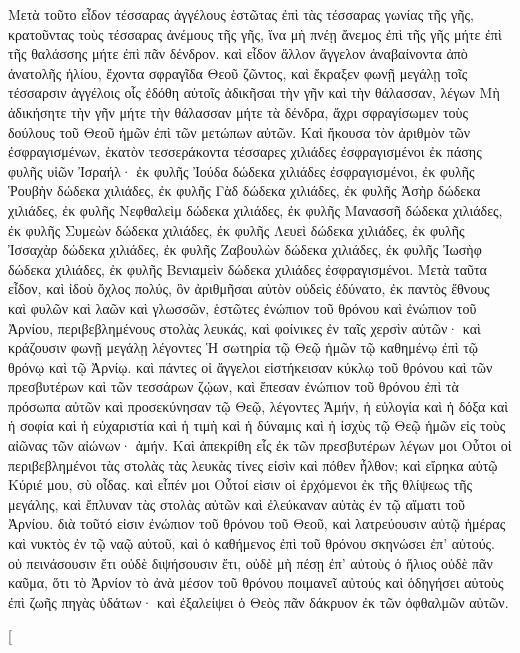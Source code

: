 \begin{pages}
    \begin{Rightside}
        \beginnumbering
		Μετὰ τοῦτο εἶδον τέσσαρας ἀγγέλους ἑστῶτας ἐπὶ τὰς τέσσαρας γωνίας τῆς γῆς, κρατοῦντας τοὺς τέσσαρας ἀνέμους τῆς γῆς, ἵνα μὴ πνέῃ ἄνεμος ἐπὶ τῆς γῆς μήτε ἐπὶ τῆς θαλάσσης μήτε ἐπὶ πᾶν δένδρον. 
		\pend
		\pstart
		καὶ εἶδον ἄλλον ἄγγελον ἀναβαίνοντα ἀπὸ ἀνατολῆς ἡλίου, ἔχοντα σφραγῖδα Θεοῦ ζῶντος, καὶ ἔκραξεν φωνῇ μεγάλῃ τοῖς τέσσαρσιν ἀγγέλοις οἷς ἐδόθη αὐτοῖς ἀδικῆσαι τὴν γῆν καὶ τὴν θάλασσαν, λέγων Μὴ ἀδικήσητε τὴν γῆν μήτε τὴν θάλασσαν μήτε τὰ δένδρα, ἄχρι σφραγίσωμεν τοὺς δούλους τοῦ Θεοῦ ἡμῶν ἐπὶ τῶν μετώπων αὐτῶν. Καὶ ἤκουσα τὸν ἀριθμὸν τῶν ἐσφραγισμένων, ἑκατὸν τεσσεράκοντα τέσσαρες χιλιάδες ἐσφραγισμένοι ἐκ πάσης φυλῆς υἱῶν Ἰσραήλ·
		\pend 
		\pstart
		ἐκ φυλῆς Ἰούδα δώδεκα χιλιάδες ἐσφραγισμένοι, ἐκ φυλῆς Ῥουβὴν δώδεκα χιλιάδες, ἐκ φυλῆς Γὰδ δώδεκα χιλιάδες, ἐκ φυλῆς Ἀσὴρ δώδεκα χιλιάδες, ἐκ φυλῆς Νεφθαλεὶμ δώδεκα χιλιάδες, ἐκ φυλῆς Μανασσῆ δώδεκα χιλιάδες, ἐκ φυλῆς Συμεὼν δώδεκα χιλιάδες, ἐκ φυλῆς Λευεὶ δώδεκα χιλιάδες, ἐκ φυλῆς Ἰσσαχὰρ δώδεκα χιλιάδες, ἐκ φυλῆς Ζαβουλὼν δώδεκα χιλιάδες, ἐκ φυλῆς Ἰωσὴφ δώδεκα χιλιάδες, ἐκ φυλῆς Βενιαμεὶν δώδεκα χιλιάδες ἐσφραγισμένοι.
		\pend
		\pstart
		Μετὰ ταῦτα εἶδον, καὶ ἰδοὺ ὄχλος πολύς, ὃν ἀριθμῆσαι αὐτὸν οὐδεὶς ἐδύνατο, ἐκ παντὸς ἔθνους καὶ φυλῶν καὶ λαῶν καὶ γλωσσῶν, ἑστῶτες ἐνώπιον τοῦ θρόνου καὶ ἐνώπιον τοῦ Ἀρνίου, περιβεβλημένους στολὰς λευκάς, καὶ φοίνικες ἐν ταῖς χερσὶν αὐτῶν· καὶ κράζουσιν φωνῇ μεγάλῃ λέγοντες Ἡ σωτηρία τῷ Θεῷ ἡμῶν τῷ καθημένῳ ἐπὶ τῷ θρόνῳ καὶ τῷ Ἀρνίῳ.
		\pend
		\pstart
		καὶ πάντες οἱ ἄγγελοι εἱστήκεισαν κύκλῳ τοῦ θρόνου καὶ τῶν πρεσβυτέρων καὶ τῶν τεσσάρων ζῴων, καὶ ἔπεσαν ἐνώπιον τοῦ θρόνου ἐπὶ τὰ πρόσωπα αὐτῶν καὶ προσεκύνησαν τῷ Θεῷ, λέγοντες Ἀμήν, ἡ εὐλογία καὶ ἡ δόξα καὶ ἡ σοφία καὶ ἡ εὐχαριστία καὶ ἡ τιμὴ καὶ ἡ δύναμις καὶ ἡ 	ἰσχὺς τῷ Θεῷ ἡμῶν εἰς τοὺς αἰῶνας τῶν αἰώνων· ἀμήν.
		\pend
		\pstart
		Καὶ ἀπεκρίθη εἷς ἐκ τῶν πρεσβυτέρων λέγων μοι Οὗτοι οἱ περιβεβλημένοι τὰς στολὰς τὰς λευκὰς τίνες εἰσὶν καὶ πόθεν ἦλθον; καὶ εἴρηκα αὐτῷ Κύριέ μου, σὺ οἶδας. καὶ εἶπέν μοι Οὗτοί εἰσιν οἱ ἐρχόμενοι ἐκ τῆς θλίψεως τῆς μεγάλης, καὶ ἔπλυναν τὰς στολὰς αὐτῶν καὶ ἐλεύκαναν αὐτὰς ἐν τῷ αἵματι τοῦ Ἀρνίου. διὰ τοῦτό εἰσιν ἐνώπιον τοῦ θρόνου τοῦ Θεοῦ, καὶ λατρεύουσιν αὐτῷ ἡμέρας καὶ νυκτὸς ἐν τῷ ναῷ αὐτοῦ, καὶ ὁ καθήμενος ἐπὶ τοῦ θρόνου σκηνώσει ἐπ’ αὐτούς. οὐ πεινάσουσιν ἔτι οὐδὲ διψήσουσιν ἔτι, οὐδὲ μὴ πέσῃ ἐπ’ αὐτοὺς ὁ ἥλιος οὐδὲ πᾶν καῦμα, ὅτι τὸ Ἀρνίον τὸ ἀνὰ μέσον τοῦ θρόνου ποιμανεῖ αὐτούς καὶ ὁδηγήσει αὐτοὺς ἐπὶ ζωῆς πηγὰς ὑδάτων· καὶ ἐξαλείψει ὁ Θεὸς πᾶν δάκρυον ἐκ τῶν ὀφθαλμῶν αὐτῶν.
		\pend
        \endnumbering
    \end{Rightside}
    \begin{Leftside}
        \beginnumbering
        \pstart[

\end{Leftside}
\end{pages}
